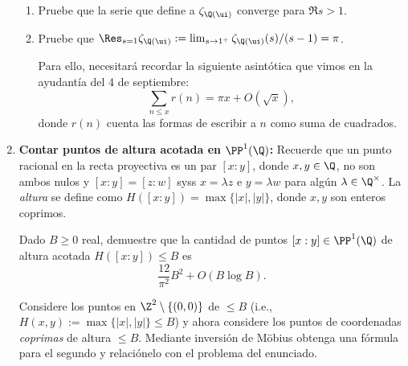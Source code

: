 \documentclass[11pt, reqno]{amsart}
\begin{document}
\begin{enumerate}
\begin{enumerate}
			\item Pruebe que la serie que define a $\zeta_{\Q(\ui)}$ converge para $\Re s > 1$.

			\item\lookst
				Pruebe que $\Res_{s=1} \zeta_{\Q(\ui)} := \lim_{s \to 1^+} \zeta_{\Q(\ui)}(s)/(s - 1) = \pi$.
				\begin{hint}
					Para ello, necesitará recordar la siguiente asintótica que vimos en la ayudantía
					 del 4 de septiembre:
					\[
						\sum_{n\le x} r(n) = \pi x + O(\sqrt{x}),
					\]
					donde $r(n)$ cuenta las formas de escribir a $n$ como suma de cuadrados.
				\end{hint}
		\end{enumerate}

		\newex
	\item\label{ex:bound_height} \lookst
		\textbf{Contar puntos de altura acotada en $\PP^1(\Q)$:}
		Recuerde que un punto racional en la recta proyectiva es un par $[x : y]$, donde $x, y \in \Q$, no son ambos nulos y $[x :
		y] = [z : w]$ syss $x = \lambda z$ e $y = \lambda w$ para algún $\lambda \in \Q^\times$.
		La \emph{altura} se define como $H([x : y]) = \max\{ |x|, |y| \}$, donde $x, y$ son enteros coprimos.

		Dado $B \ge 0$ real, demuestre que la cantidad de puntos $[x : y] \in \PP^1(\Q)$ de altura acotada $H([x : y]) \le B$ es
		$$ \frac{12}{\pi^2}B^2 + O(B \log B). $$
		\begin{hint}
			Considere los puntos en $\Z^2 \setminus \{ (0, 0) \}$ de  $\le B$ (i.e., $H(x, y) := \max\{ |x|,
			|y| \} \le B$) y ahora considere los puntos de coordenadas \emph{coprimas} de altura $\le B$.
			Mediante inversión de Möbius obtenga una fórmula para el segundo y relaciónelo con el problema del enunciado.
		\end{hint}
\end{enumerate}
\end{document}

